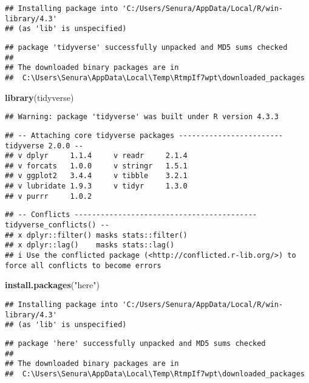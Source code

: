 \documentclass[
]{article}
\newenvironment{Shaded}{\begin{snugshade}}{\end{snugshade}}
\newcommand{\FunctionTok}[1]{\textcolor[rgb]{0.13,0.29,0.53}{\textbf{#1}}}
\newcommand{\NormalTok}[1]{#1}
\newcommand{\StringTok}[1]{\textcolor[rgb]{0.31,0.60,0.02}{#1}}
\begin{document}
\begin{verbatim}
## Installing package into 'C:/Users/Senura/AppData/Local/R/win-library/4.3'
## (as 'lib' is unspecified)
\end{verbatim}

\begin{verbatim}
## package 'tidyverse' successfully unpacked and MD5 sums checked
## 
## The downloaded binary packages are in
##  C:\Users\Senura\AppData\Local\Temp\RtmpIf7wpt\downloaded_packages
\end{verbatim}

\begin{Shaded}
\begin{Highlighting}[]
\FunctionTok{library}\NormalTok{(tidyverse)}
\end{Highlighting}
\end{Shaded}

\begin{verbatim}
## Warning: package 'tidyverse' was built under R version 4.3.3
\end{verbatim}

\begin{verbatim}
## -- Attaching core tidyverse packages ------------------------ tidyverse 2.0.0 --
## v dplyr     1.1.4     v readr     2.1.4
## v forcats   1.0.0     v stringr   1.5.1
## v ggplot2   3.4.4     v tibble    3.2.1
## v lubridate 1.9.3     v tidyr     1.3.0
## v purrr     1.0.2
\end{verbatim}

\begin{verbatim}
## -- Conflicts ------------------------------------------ tidyverse_conflicts() --
## x dplyr::filter() masks stats::filter()
## x dplyr::lag()    masks stats::lag()
## i Use the conflicted package (<http://conflicted.r-lib.org/>) to force all conflicts to become errors
\end{verbatim}

\begin{Shaded}
\begin{Highlighting}[]
\FunctionTok{install.packages}\NormalTok{(}\StringTok{"here"}\NormalTok{)}
\end{Highlighting}
\end{Shaded}

\begin{verbatim}
## Installing package into 'C:/Users/Senura/AppData/Local/R/win-library/4.3'
## (as 'lib' is unspecified)
\end{verbatim}

\begin{verbatim}
## package 'here' successfully unpacked and MD5 sums checked
## 
## The downloaded binary packages are in
##  C:\Users\Senura\AppData\Local\Temp\RtmpIf7wpt\downloaded_packages
\end{verbatim}
\end{document}

